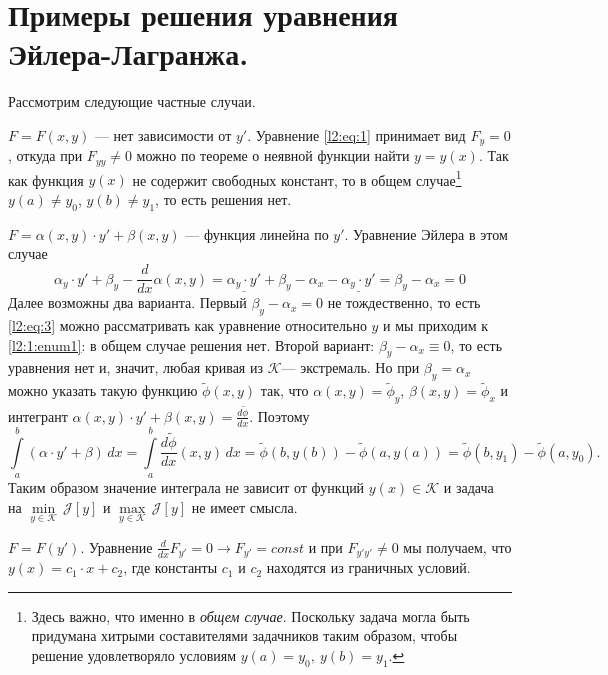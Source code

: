 \documentclass[12pt,a4paper,openany,fleqn]{book}
\newcommand{\J}{\ensuremath{\mathcal{J}}}
\newcommand{\mc}[1]{\ensuremath{\mathcal{#1}}}
\newcommand{\der}[2]{\ensuremath{\frac{d#1}{d#2}}}
\newcommand{\K}{\mc{K}}
\theoremstyle{definition}
\begin{document}
	\section{Примеры решения уравнения Эйлера-Лагранжа.}
	\label{lecture2section1}
	Рассмотрим следующие частные случаи.
	\begin{enumerate1}
		\item $F=F(x,y)$ --- нет зависимости от $y'$. Уравнение \eqref{l2:eq:1} принимает вид $F_y=0$, откуда при $F_{yy}\neq0$ можно по теореме о неявной функции найти $y=y(x)$. Так как функция $y(x)$ не содержит свободных констант, то в общем случае\footnote[1]{Здесь важно, что именно в \emph{общем случае}. Поскольку задача могла быть придумана хитрыми составителями задачников таким образом, чтобы решение удовлетворяло условиям $y(a)=y_0,\  y(b)=y_1$.} $y(a)\neq y_0$, $y(b)\neq y_1$, то есть решения нет. 
		
		\item \label{l2:1:enum1} $F=\alpha(x,y)\cdot y'+\beta(x,y)$ --- функция линейна по $y'$. Уравнение Эйлера в этом случае
		\begin{equation}
			\label{l2:eq:3}
			\alpha_y\cdot y'+\beta_y-\der{}{x}\alpha(x,y)=\underline{\alpha_y\cdot y'}+\beta_y-\alpha_x-\underline{\alpha_y\cdot y'}=\beta_y-\alpha_x=0
		\end{equation}
		Далее возможны два варианта. Первый $\beta_y-\alpha_x=0$ не тождественно, то есть \eqref{l2:eq:3} можно рассматривать как уравнение относительно $y$ и мы приходим к \ref{l2:1:enum1}: в общем случае решения нет. 
		\noindent Второй вариант: $\beta_y-\alpha_x\equiv0$, то есть уравнения нет и, значит, любая кривая из \K --- экстремаль. Но при $\beta_y=\alpha_x$ можно указать такую функцию $\widetilde{\phi}(x,y)$ так, что $\alpha(x,y)=\widetilde{\phi}_y$, $\beta(x,y)=\widetilde{\phi}_x$ и интегрант $\alpha(x,y)\cdot y'+\beta(x,y)=\displaystyle\der{\widetilde{\phi}}{x}$. Поэтому 
		\begin{equation*}
			\int\limits_a^b(\alpha\cdot y'+\beta)\,dx=\int\limits_a^b\der{\widetilde{\phi}}{x}(x,y)\,dx=\widetilde{\phi}(b,y(b))-\widetilde{\phi}(a,y(a))=\widetilde{\phi}(b,y_1)-\widetilde{\phi}(a,y_0).
		\end{equation*}
		Таким образом значение интеграла не зависит от функций $y(x)\in\K$ и задача на $\min\limits_{y\in\K}\,\J[y]$ и $\max\limits_{y\in\K}\,\J[y]$ не имеет смысла.
		
		\item $F=F(y')$. Уравнение $\der{}{x}F_{y'}=0\rightarrow F_{y'}=const$ и при $F_{y'y'}\neq0$ мы получаем, что $y(x)=c_1\cdot x+c_2$, где константы $c_1$ и $c_2$ находятся из граничных условий.
		

\end{enumerate1}
\end{document}
